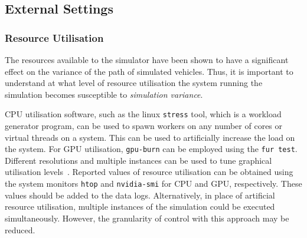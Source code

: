 \documentclass[runningheads,twocolumn,a4paper,10pt]{llncs}
\begin{document}


\subsection{External Settings} \label{ego_actor}

\subsubsection{Resource Utilisation}
The resources available to the simulator have been shown to have a significant effect on the variance of the path of simulated vehicles. %
%
Thus, it is important to understand at what level of resource utilisation the system running the simulation becomes susceptible to \textit{simulation variance}.

CPU utilisation software, such as the linux \texttt{stress} tool, which is a workload generator program, can be used to spawn workers on any number of cores or virtual threads on a system. This can be used to artificially increase the load on the system. For GPU utilisation, \texttt{gpu-burn} can be employed using the \texttt{fur test}. Different resolutions and multiple instances can be used to tune graphical utilisation levels~\cite{GPU_stress}. Reported values of resource utilisation can be obtained using the system monitors \texttt{htop} and \texttt{nvidia-smi} for CPU and GPU, respectively. These values should be added to the data logs.
%
Alternatively, in place of artificial resource utilisation, multiple instances of the simulation could be executed simultaneously. However, the granularity of control with this approach may be reduced.


\end{document}
